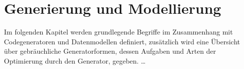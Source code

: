 \chapter{Generierung und Modellierung}
\label{chap:generation_and_modeling}


Im folgenden Kapitel werden grundlegende Begriffe im Zusammenhang mit Codegeneratoren und Datenmodellen definiert, zusätzlich wird eine Übersicht über gebräuchliche Generatorformen, dessen Aufgaben und Arten der Optimierung durch den Generator, gegeben. 
 \ldots





